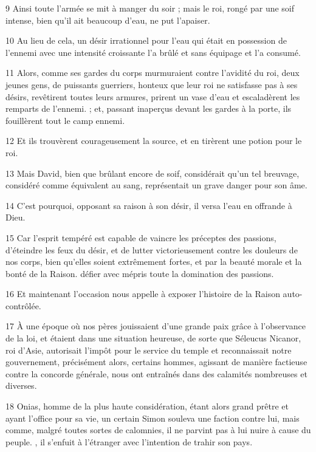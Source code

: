 \par 9 Ainsi toute l'armée se mit à manger du soir ; mais le roi, rongé par une soif intense, bien qu'il ait beaucoup d'eau, ne put l'apaiser.

\par 10 Au lieu de cela, un désir irrationnel pour l'eau qui était en possession de l'ennemi avec une intensité croissante l'a brûlé et sans équipage et l'a consumé.

\par 11 Alors, comme ses gardes du corps murmuraient contre l'avidité du roi, deux jeunes gens, de puissants guerriers, honteux que leur roi ne satisfasse pas à ses désirs, revêtirent toutes leurs armures, prirent un vase d'eau et escaladèrent les remparts de l'ennemi. ; et, passant inaperçus devant les gardes à la porte, ils fouillèrent tout le camp ennemi.

\par 12 Et ils trouvèrent courageusement la source, et en tirèrent une potion pour le roi.

\par 13 Mais David, bien que brûlant encore de soif, considérait qu'un tel breuvage, considéré comme équivalent au sang, représentait un grave danger pour son âme.

\par 14 C'est pourquoi, opposant sa raison à son désir, il versa l'eau en offrande à Dieu.

\par 15 Car l'esprit tempéré est capable de vaincre les préceptes des passions, d'éteindre les feux du désir, et de lutter victorieusement contre les douleurs de nos corps, bien qu'elles soient extrêmement fortes, et par la beauté morale et la bonté de la Raison. défier avec mépris toute la domination des passions.

\par 16 Et maintenant l'occasion nous appelle à exposer l'histoire de la Raison auto-contrôlée.

\par 17 À une époque où nos pères jouissaient d'une grande paix grâce à l'observance de la loi, et étaient dans une situation heureuse, de sorte que Séleucus Nicanor, roi d'Asie, autorisait l'impôt pour le service du temple et reconnaissait notre gouvernement, précisément alors, certains hommes, agissant de manière factieuse contre la concorde générale, nous ont entraînés dans des calamités nombreuses et diverses.

\par 18 Onias, homme de la plus haute considération, étant alors grand prêtre et ayant l'office pour sa vie, un certain Simon souleva une faction contre lui, mais comme, malgré toutes sortes de calomnies, il ne parvint pas à lui nuire à cause du peuple. , il s'enfuit à l'étranger avec l'intention de trahir son pays.

